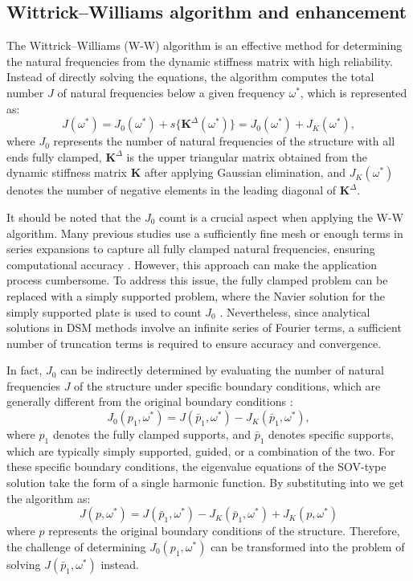 \documentclass[preprint,12pt,number]{elsarticle}
\begin{document}
\subsection{Wittrick–Williams algorithm and enhancement}\label{sec:WWA2}
The Wittrick–Williams (W-W) algorithm \cite{wittrick1971general} is an effective method for determining the natural frequencies from the dynamic stiffness matrix with high reliability. 
Instead of directly solving the equations, the algorithm computes the total number $J$ of natural frequencies below a given frequency $\omega^*$, which is represented as:
%
\begin{equation}\label{eq:WWalgorithm}
    J(\omega^*) = J_0(\omega^*) + s\{\mathbf{K}^{\Delta}(\omega^*)\} = J_0(\omega^*) + J_K(\omega^*),
\end{equation}
%
where $J_0$ represents the number of natural frequencies of the structure with all ends fully clamped, $\mathbf{K}^{\Delta}$ is the upper triangular matrix obtained from the dynamic stiffness matrix $\mathbf{K}$ after applying Gaussian elimination, and $J_K(\omega^*)$ denotes the number of negative elements in the leading diagonal of $\mathbf{K}^{\Delta}$.

It should be noted that the $J_0$ count is a crucial aspect when applying the W-W algorithm.
Many previous studies use a sufficiently fine mesh or enough terms in series expansions to capture all fully clamped natural frequencies, ensuring computational accuracy \cite{banerjee2015dynamic}.
However, this approach can make the application process cumbersome. 
To address this issue, the fully clamped problem can be replaced with a simply supported problem, where the Navier solution for the simply supported plate is used to count $J_0$ \citep{liu2015exact}. 
Nevertheless, since analytical solutions in DSM methods involve an infinite series of Fourier terms, a sufficient number of truncation terms is required to ensure accuracy and convergence.   

In fact, $ J_0 $ can be indirectly determined by evaluating the number of natural frequencies $ J $ of the structure under specific boundary conditions, which are generally different from the original boundary conditions \cite{han2018improved}:
%
\begin{equation}\label{eq:J_o_pin}
    J_0(p_1,\omega^*) = J(\bar{p}_1,\omega^*) - J_K(\bar{p}_1,\omega^*),
\end{equation}
%
where $ p_1 $ denotes the fully clamped supports, and $ \bar{p}_1 $ denotes specific supports, which are typically simply supported, guided, or a combination of the two.
For these specific boundary conditions, the eigenvalue equations of the SOV-type solution take the form of a single harmonic function.
By substituting  into  we get the algorithm as:  
%
\begin{equation}\label{eq:new_WWalgorithm}
    J(p,\omega^*) = J(\bar{p}_1,\omega^*) - J_K(\bar{p}_1,\omega^*) + J_K(p,\omega^*)
\end{equation} 
%
where $p$ represents the original boundary conditions of the structure.
Therefore, the challenge of determining $J_0(p_1, \omega^*)$ can be transformed into the problem of solving $ J(\bar{p}_1, \omega^*)$ instead. 
\end{document}
